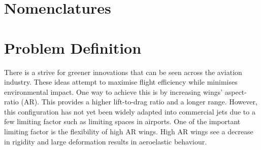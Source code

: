 \documentclass[11pt]{article}
\begin{document}
\newpage
\tableofcontents
\newpage
\listoffigures
\listoftables

\section*{Nomenclatures}
\begin{table}[H]
    
    \label{tab:nomen}
\end{table}
\cleardoublepage
\newpage
\section{Problem Definition}
\label{sec:prob-def}
There is a strive for greener innovations that can be seen across the aviation industry. These ideas attempt to maximise flight efficiency while minimises environmental impact. One way to achieve this is by increasing wings' aspect-ratio (AR). This provides a higher lift-to-drag ratio and a longer range. However, this configuration has not yet been widely adapted into commercial jets due to a few limiting factor such as limiting spaces in airports. One of the important limiting factor is the flexibility of high AR wings. High AR wings see a decrease in rigidity and large deformation results in aeroelastic behaviour.\\ 
\end{document}
